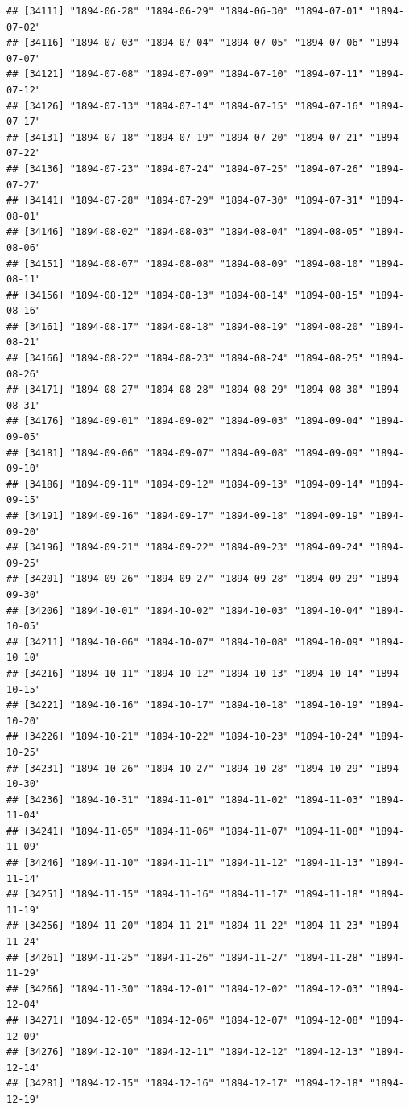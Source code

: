 \documentclass{article}\usepackage[]{graphicx}\usepackage[]{color}
\makeatletter
\newenvironment{kframe}{%
 \def\at@end@of@kframe{}%
 \ifinner\ifhmode%
  \def\at@end@of@kframe{\end{minipage}}%
  \begin{minipage}{\columnwidth}%
 \fi\fi%
 \def\FrameCommand##1{\hskip\@totalleftmargin \hskip-\fboxsep
 \colorbox{shadecolor}{##1}\hskip-\fboxsep
     \hskip-\linewidth \hskip-\@totalleftmargin \hskip\columnwidth}%
 \MakeFramed {\advance\hsize-\width
   \@totalleftmargin\z@ \linewidth\hsize
   \@setminipage}}%
 {\par\unskip\endMakeFramed%
 \at@end@of@kframe}
\newenvironment{knitrout}{}{} %
\makeatother
\begin{document}
\begin{description}
\begin{knitrout}
\begin{kframe}
\begin{verbatim}
## [34111] "1894-06-28" "1894-06-29" "1894-06-30" "1894-07-01" "1894-07-02"
## [34116] "1894-07-03" "1894-07-04" "1894-07-05" "1894-07-06" "1894-07-07"
## [34121] "1894-07-08" "1894-07-09" "1894-07-10" "1894-07-11" "1894-07-12"
## [34126] "1894-07-13" "1894-07-14" "1894-07-15" "1894-07-16" "1894-07-17"
## [34131] "1894-07-18" "1894-07-19" "1894-07-20" "1894-07-21" "1894-07-22"
## [34136] "1894-07-23" "1894-07-24" "1894-07-25" "1894-07-26" "1894-07-27"
## [34141] "1894-07-28" "1894-07-29" "1894-07-30" "1894-07-31" "1894-08-01"
## [34146] "1894-08-02" "1894-08-03" "1894-08-04" "1894-08-05" "1894-08-06"
## [34151] "1894-08-07" "1894-08-08" "1894-08-09" "1894-08-10" "1894-08-11"
## [34156] "1894-08-12" "1894-08-13" "1894-08-14" "1894-08-15" "1894-08-16"
## [34161] "1894-08-17" "1894-08-18" "1894-08-19" "1894-08-20" "1894-08-21"
## [34166] "1894-08-22" "1894-08-23" "1894-08-24" "1894-08-25" "1894-08-26"
## [34171] "1894-08-27" "1894-08-28" "1894-08-29" "1894-08-30" "1894-08-31"
## [34176] "1894-09-01" "1894-09-02" "1894-09-03" "1894-09-04" "1894-09-05"
## [34181] "1894-09-06" "1894-09-07" "1894-09-08" "1894-09-09" "1894-09-10"
## [34186] "1894-09-11" "1894-09-12" "1894-09-13" "1894-09-14" "1894-09-15"
## [34191] "1894-09-16" "1894-09-17" "1894-09-18" "1894-09-19" "1894-09-20"
## [34196] "1894-09-21" "1894-09-22" "1894-09-23" "1894-09-24" "1894-09-25"
## [34201] "1894-09-26" "1894-09-27" "1894-09-28" "1894-09-29" "1894-09-30"
## [34206] "1894-10-01" "1894-10-02" "1894-10-03" "1894-10-04" "1894-10-05"
## [34211] "1894-10-06" "1894-10-07" "1894-10-08" "1894-10-09" "1894-10-10"
## [34216] "1894-10-11" "1894-10-12" "1894-10-13" "1894-10-14" "1894-10-15"
## [34221] "1894-10-16" "1894-10-17" "1894-10-18" "1894-10-19" "1894-10-20"
## [34226] "1894-10-21" "1894-10-22" "1894-10-23" "1894-10-24" "1894-10-25"
## [34231] "1894-10-26" "1894-10-27" "1894-10-28" "1894-10-29" "1894-10-30"
## [34236] "1894-10-31" "1894-11-01" "1894-11-02" "1894-11-03" "1894-11-04"
## [34241] "1894-11-05" "1894-11-06" "1894-11-07" "1894-11-08" "1894-11-09"
## [34246] "1894-11-10" "1894-11-11" "1894-11-12" "1894-11-13" "1894-11-14"
## [34251] "1894-11-15" "1894-11-16" "1894-11-17" "1894-11-18" "1894-11-19"
## [34256] "1894-11-20" "1894-11-21" "1894-11-22" "1894-11-23" "1894-11-24"
## [34261] "1894-11-25" "1894-11-26" "1894-11-27" "1894-11-28" "1894-11-29"
## [34266] "1894-11-30" "1894-12-01" "1894-12-02" "1894-12-03" "1894-12-04"
## [34271] "1894-12-05" "1894-12-06" "1894-12-07" "1894-12-08" "1894-12-09"
## [34276] "1894-12-10" "1894-12-11" "1894-12-12" "1894-12-13" "1894-12-14"
## [34281] "1894-12-15" "1894-12-16" "1894-12-17" "1894-12-18" "1894-12-19"

\end{verbatim}
\end{kframe}
\end{knitrout}
\end{description}
\end{document}
